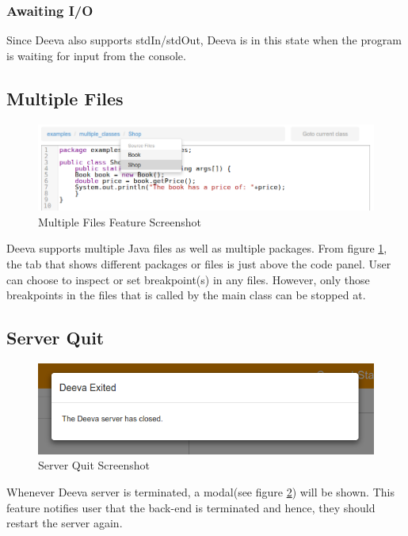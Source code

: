\documentclass[11pt, a4paper]{article}
\begin{document}
\subsubsection{Awaiting I/O}
Since Deeva also supports stdIn/stdOut, Deeva is in this state when the program is waiting for input from the console.

\subsection{Multiple Files}
\begin{figure}[h!]
\centering
\includegraphics[scale=0.5]{multipleFileFeature.png}
\caption{Multiple Files Feature Screenshot}
\label{fig:multipleFile}
\end{figure}
Deeva supports multiple Java files as well as multiple packages. From figure \ref{fig:multipleFile}, the tab that shows different packages or files is just above the code panel. User can choose to inspect or set breakpoint(s) in any files. However, only those breakpoints in the files that is called by the main class can be stopped at.

\subsection{Server Quit}
\begin{figure}[h!]
\centering
\includegraphics[scale=0.6]{exitFeature.png}
\caption{Server Quit Screenshot}
\label{fig:quitFeature}
\end{figure}
Whenever Deeva server is terminated, a modal(see figure \ref{fig:quitFeature}) will be shown. This feature notifies user that the back-end is terminated and hence, they should restart the server again.
\end{document}
